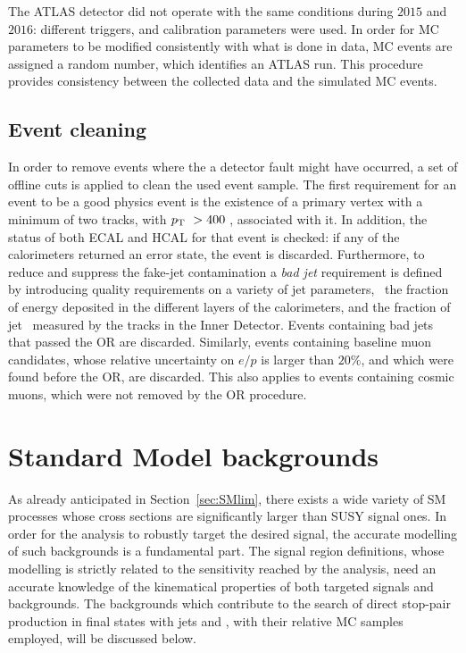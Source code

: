 		The \ac{ATLAS} detector did not operate with the same conditions during $2015$ and $2016$: different triggers, and calibration parameters were used. In order for \ac{MC} parameters to be modified consistently with what is done in data, \ac{MC} events are assigned a random number, which identifies an ATLAS run. This procedure provides consistency between the collected data and the simulated \ac{MC} events. %

		\subsection{Event cleaning}

			In order to remove events where the a detector fault might have occurred, a set of offline cuts is applied to clean the used event sample. The first requirement for an event to be a good physics event is the existence of a primary vertex with a minimum of two tracks, with $p_{\mathrm{T}}\ > 400$ \MeV, associated with it. In addition, the status of both \ac{ECAL} and \ac{HCAL} for that event is checked: if any of the calorimeters returned an error state, the event is discarded. Furthermore, to reduce and suppress the fake-jet contamination a \emph{bad jet} requirement is defined by introducing quality requirements on a variety of jet parameters, \eg\ the fraction of energy deposited in the different layers of the calorimeters, and the fraction of jet \pt\ measured by the tracks in the Inner Detector. Events containing bad jets that passed the \ac{OR} are discarded. Similarly, events containing baseline muon candidates, whose relative uncertainty on $e/p$ is larger than $20\%$, and which were found before the \ac{OR}, are discarded. This also applies to events containing cosmic muons, which were not removed by the \ac{OR} procedure.				


	\section{Standard Model backgrounds}
	\label{sec:SMbkg}

		As already anticipated in Section~\ref{sec:SMlim}, there exists a wide variety of \ac{SM} processes whose cross sections are significantly larger than \ac{SUSY} signal ones. In order for the analysis to robustly target the desired signal, the accurate modelling of such backgrounds is a fundamental part. The signal region definitions, whose modelling is strictly related to the sensitivity reached by the analysis, need an accurate knowledge of the kinematical properties of both targeted signals and backgrounds. The backgrounds which contribute to the search of direct stop-pair production in final states with jets and \met, with their relative \ac{MC} samples employed, will be discussed below.

